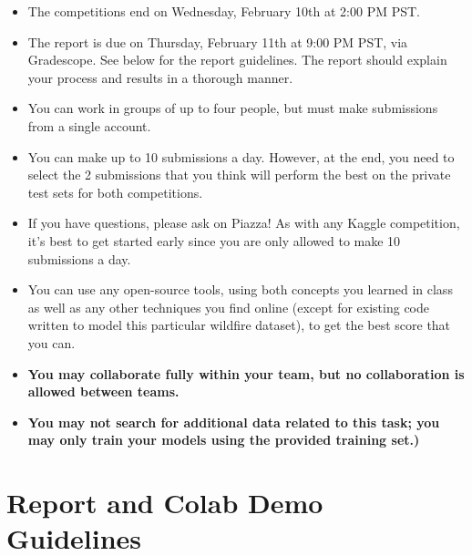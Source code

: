 \begin{itemize}
\item The competitions end on Wednesday, February 10th at 2:00 PM PST.
\item The report is due on Thursday, February 11th at 9:00 PM PST, via Gradescope. See below for the report guidelines. The report should explain your process and results in a thorough manner.
\item You can work in groups of up to four people, but must make submissions from a single account.
\item You can make up to 10 submissions a day. However, at the end, you need to select the 2 submissions that you think will perform the best on the private test sets for both competitions.
\item If you have questions, please ask on Piazza! As with any Kaggle competition, it's best to get started early since you are only allowed to make 10 submissions a day.
\item You can use any open-source tools, using both concepts you learned in class as well as any other techniques you find online (except for existing code written to model this particular wildfire dataset), to get the best score that you can.
\item \textbf{You may collaborate fully within your team, but no collaboration is allowed between teams.}
\item \textbf{You may not search for additional data related to this task; you may only train your models using the provided training set.)}
\end{itemize}


\section{Report and Colab Demo Guidelines}
\medskip

